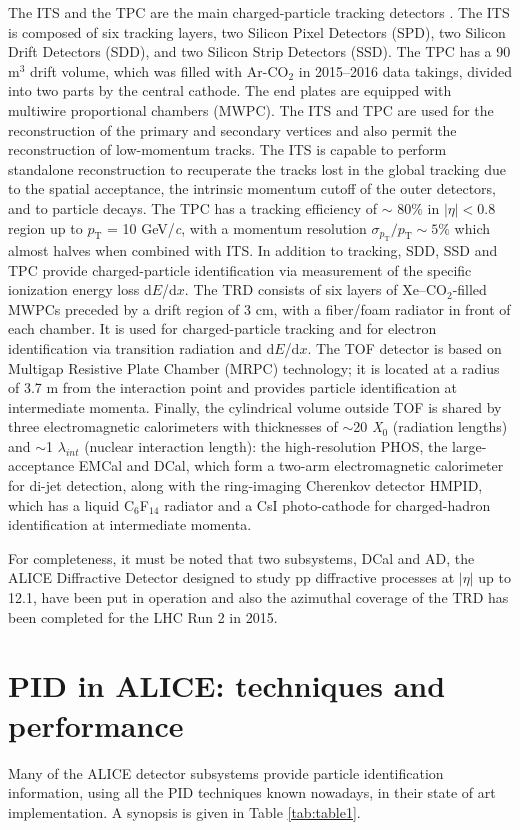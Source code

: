 \documentclass[10pt]{article}
\begin{document}
The ITS and the TPC are the main charged-particle tracking detectors \cite{ref:perf}. The ITS is composed of six tracking layers, two Silicon Pixel Detectors (SPD), two Silicon Drift Detectors (SDD), and two Silicon Strip Detectors (SSD). The TPC has a 90 m$^{3}$ drift volume, which was  filled with 
Ar-CO$_{2}$ in 2015--2016 data takings, divided into two parts by the central cathode. The end plates are equipped with multiwire proportional chambers (MWPC). The ITS and TPC are used for the reconstruction of the primary and secondary vertices and also permit the reconstruction of low-momentum tracks. The ITS is capable to perform standalone reconstruction to recuperate the tracks lost in the global tracking due to the spatial acceptance, the intrinsic momentum cutoff of the outer detectors, and to particle decays. The TPC has a tracking efficiency of $\sim$ 80$\%$ in $|\eta |< 0.8$ region up to $p_{\mathrm{T}}$ = 10 GeV/{\it c}, with a momentum resolution $\sigma_{p_{\mathrm{T}}}/p_{\mathrm{T}} \sim 5 \%$ which almost halves when combined with ITS. In addition to tracking, SDD, SSD and TPC provide charged-particle identification via measurement of the specific ionization energy loss d$E$/d$x$.
The TRD consists of six layers of Xe–CO$_{2}$-filled MWPCs preceded by a drift region of 3 cm, with a fiber/foam radiator in front of each chamber. It is used for charged-particle tracking and for electron identification via transition radiation and d$E$/d$x$. The TOF detector is based on Multigap Resistive Plate Chamber (MRPC) technology; it is located at a radius of 3.7 m from the interaction point and provides particle identification at intermediate momenta.
%
Finally, the cylindrical volume outside TOF is shared by three electromagnetic calorimeters with thicknesses of $\sim$20 {\it X}$_{0}$ (radiation lengths) and $\sim$1 $\lambda_{int}$ (nuclear interaction length): the high-resolution PHOS, the large-acceptance EMCal and DCal, which form a two-arm electromagnetic calorimeter for di-jet detection, along with the ring-imaging Cherenkov detector HMPID, which has a liquid C$_{6}$F$_{14}$ radiator and a CsI photo-cathode for charged-hadron identification at intermediate momenta.

For completeness, it must be noted that two subsystems, DCal and AD, the ALICE Diffractive Detector designed to study pp diffractive processes at $|\eta|$ up to 12.1, have been put in operation and also the azimuthal coverage of the TRD has been completed for the LHC Run 2 in 2015.

\section{PID in ALICE: techniques and performance}
Many of the ALICE detector subsystems provide particle identification information, using all the PID techniques known nowadays, in their state of art implementation. A synopsis is given in Table \ref{tab:table1}.
\end{document}
